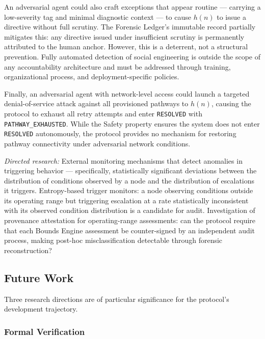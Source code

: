 An adversarial agent could also craft exceptions that appear routine --- carrying a low-severity tag and minimal diagnostic context --- to cause $h(n)$ to issue a directive without full scrutiny. The Forensic Ledger's immutable record partially mitigates this: any directive issued under insufficient scrutiny is permanently attributed to the human anchor. However, this is a deterrent, not a structural prevention. Fully automated detection of social engineering is outside the scope of any accountability architecture and must be addressed through training, organizational process, and deployment-specific policies.

Finally, an adversarial agent with network-level access could launch a targeted denial-of-service attack against all provisioned pathways to $h(n)$, causing the protocol to exhaust all retry attempts and enter \texttt{RESOLVED} with \texttt{PATHWAY\_EXHAUSTED}. While the Safety property ensures the system does not enter \texttt{RESOLVED} autonomously, the protocol provides no mechanism for restoring pathway connectivity under adversarial network conditions.

\textit{Directed research:} External monitoring mechanisms that detect anomalies in triggering behavior --- specifically, statistically significant deviations between the distribution of conditions observed by a node and the distribution of escalations it triggers. Entropy-based trigger monitors: a node observing conditions outside its operating range but triggering escalation at a rate statistically inconsistent with its observed condition distribution is a candidate for audit. Investigation of provenance attestation for operating-range assessments: can the protocol require that each Bounds Engine assessment be counter-signed by an independent audit process, making post-hoc misclassification detectable through forensic reconstruction?

\subsection{Future Work}
\label{sec:future-work}

Three research directions are of particular significance for the protocol's development trajectory.

\subsubsection{Formal Verification}
\label{sec:formal-verification}

